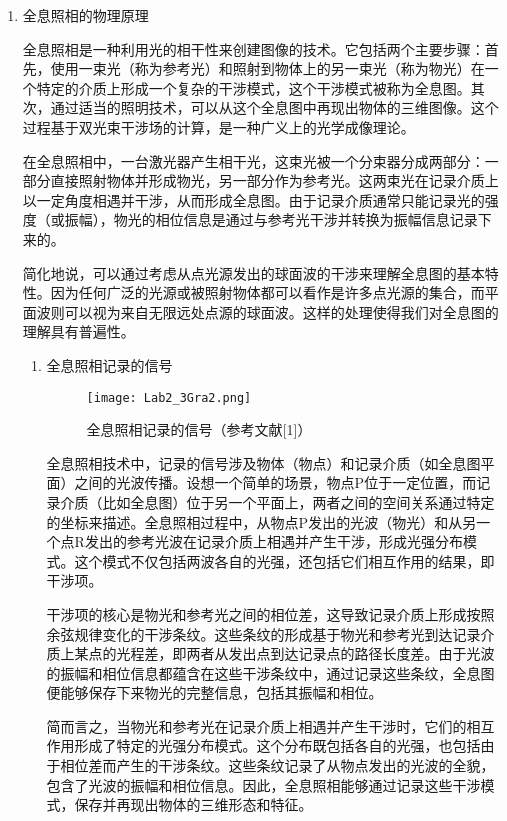 \documentclass[dvipsnames, svgnames,a4paper,11pt]{article}
\begin{document}
\begin{enumerate}
		\item 全息照相的物理原理
		
		全息照相是一种利用光的相干性来创建图像的技术。它包括两个主要步骤：首先，使用一束光（称为参考光）和照射到物体上的另一束光（称为物光）在一个特定的介质上形成一个复杂的干涉模式，这个干涉模式被称为全息图。其次，通过适当的照明技术，可以从这个全息图中再现出物体的三维图像。这个过程基于双光束干涉场的计算，是一种广义上的光学成像理论。
		
		在全息照相中，一台激光器产生相干光，这束光被一个分束器分成两部分：一部分直接照射物体并形成物光，另一部分作为参考光。这两束光在记录介质上以一定角度相遇并干涉，从而形成全息图。由于记录介质通常只能记录光的强度（或振幅），物光的相位信息是通过与参考光干涉并转换为振幅信息记录下来的。
		
		简化地说，可以通过考虑从点光源发出的球面波的干涉来理解全息图的基本特性。因为任何广泛的光源或被照射物体都可以看作是许多点光源的集合，而平面波则可以视为来自无限远处点源的球面波。这样的处理使得我们对全息图的理解具有普遍性。
		
		\begin{enumerate}
			\item 全息照相记录的信号
			
			\begin{figure}[htbp]
				\centering
				\texttt{[image: Lab2\_3Gra2.png]}
				\caption{全息照相记录的信号（参考文献[1]）}
				\label{fig:fig2}
			\end{figure}
			
			全息照相技术中，记录的信号涉及物体（物点）和记录介质（如全息图平面）之间的光波传播。设想一个简单的场景，物点P位于一定位置，而记录介质（比如全息图）位于另一个平面上，两者之间的空间关系通过特定的坐标来描述。全息照相过程中，从物点P发出的光波（物光）和从另一个点R发出的参考光波在记录介质上相遇并产生干涉，形成光强分布模式。这个模式不仅包括两波各自的光强，还包括它们相互作用的结果，即干涉项。
			
			干涉项的核心是物光和参考光之间的相位差，这导致记录介质上形成按照余弦规律变化的干涉条纹。这些条纹的形成基于物光和参考光到达记录介质上某点的光程差，即两者从发出点到达记录点的路径长度差。由于光波的振幅和相位信息都蕴含在这些干涉条纹中，通过记录这些条纹，全息图便能够保存下来物光的完整信息，包括其振幅和相位。
			
			简而言之，当物光和参考光在记录介质上相遇并产生干涉时，它们的相互作用形成了特定的光强分布模式。这个分布既包括各自的光强，也包括由于相位差而产生的干涉条纹。这些条纹记录了从物点发出的光波的全貌，包含了光波的振幅和相位信息。因此，全息照相能够通过记录这些干涉模式，保存并再现出物体的三维形态和特征。
			

\end{enumerate}
\end{enumerate}
\end{document}

